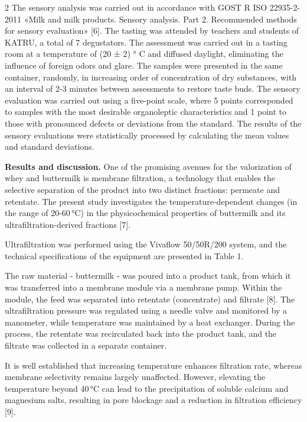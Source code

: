 \begin{multicols}{2}
The sensory analysis was carried out in accordance with GOST R ISO
22935-2-2011 «Milk and milk products. Sensory analysis. Part 2.
Recommended methods for sensory evaluation» {[}6{]}. The tasting was
attended by teachers and students of KATRU, a total of 7 degustators.
The assessment was carried out in a tasting room at a temperature of (20
± 2) ° C and diffused daylight, eliminating the influence of foreign
odors and glare. The samples were presented in the same container,
randomly, in increasing order of concentration of dry substances, with
an interval of 2-3 minutes between assessments to restore taste buds.
The sensory evaluation was carried out using a five-point scale, where 5
points corresponded to samples with the most desirable organoleptic
characteristics and 1 point to those with pronounced defects or
deviations from the standard. The results of the sensory evaluations
were statistically processed by calculating the mean values and standard
deviations.

{\bfseries Results and discussion.} One of the promising avenues for the
valorization of whey and buttermilk is membrane filtration, a technology
that enables the selective separation of the product into two distinct
fractions: permeate and retentate. The present study investigates the
temperature-dependent changes (in the range of 20-60\,°C) in the
physicochemical properties of buttermilk and its ultrafiltration-derived
fractions {[}7{]}.

Ultrafiltration was performed using the Vivaflow 50/50R/200 system, and
the technical specifications of the equipment are presented in Table 1.

The raw material - buttermilk - was poured into a product tank, from
which it was transferred into a membrane module via a membrane pump.
Within the module, the feed was separated into retentate (concentrate)
and filtrate {[}8{]}. The ultrafiltration pressure was regulated using a
needle valve and monitored by a manometer, while temperature was
maintained by a heat exchanger. During the process, the retentate was
recirculated back into the product tank, and the filtrate was collected
in a separate container.

It is well established that increasing temperature enhances filtration
rate, whereas membrane selectivity remains largely unaffected. However,
elevating the temperature beyond 40\,°C can lead to the precipitation of
soluble calcium and magnesium salts, resulting in pore blockage and a
reduction in filtration efficiency {[}9{]}.
\end{multicols}

